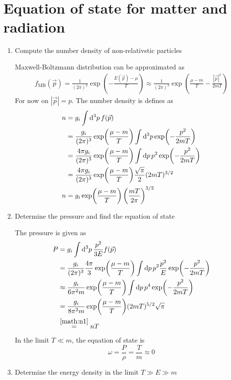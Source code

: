 \section{Equation of state for matter and radiation}

\begin{enumerate}[label=(\alph*)]
   \item Compute the number density of non-relativstic particles
   
      Maxwell-Boltzmann distribution can be approximated as
      \begin{align*}
         f_\text{MB}(\vec{p}) = \frac{1}{(2\pi)^3} \exp(-\frac{E(\vec{p}) - \mu}{T}) \approx \frac{1}{(2\pi)^3} \exp(\frac{\mu - m }{T} - \frac{|\vec{p}|^2}{2mT})
      \end{align*}
      For now on $|\vec{p}| = p$.
      The number density is defines as
      \begin{align}
         n &= g_i \int \dd[3]{p} f(\vec{p}) \notag \\
           &= \frac{g_i}{(2\pi)^3} \exp(\frac{\mu-m}{T}) \int \dd[3]{p} \exp(-\frac{p^2}{2mT}) \notag\\
           &= \frac{4 \pi g_i}{(2\pi)^3} \exp(\frac{\mu-m}{T}) \int \dd{p} p^2 \exp(-\frac{p^2}{2mT}) \notag\\
           &= \frac{4 \pi g_i}{(2\pi)^3} \exp(\frac{\mu-m}{T}) \frac{\sqrt{\pi}}{2} (2mT)^{3/2} \notag\\
         n &= g_i \exp(\frac{\mu-m}{T}) \left( \frac{mT}{2\pi} \right)^{3/2} \label{math:n1}
      \end{align}
   \item Determine the pressure and find the equation of state

         The pressure is given as
         \begin{align}
            P &= g_i \int \dd[3]{p} \frac{p^2}{3 E} f(\vec{p}) \notag \\
              &= \frac{g_i}{(2\pi)^3} \frac{4\pi}{3} \exp(\frac{\mu-m}{T}) \int \dd{p} p^2 \frac{p^2}{E} \exp(-\frac{p^2}{2mT}) \notag \\
              &\approx \frac{g_i}{6\pi^2 m }  \exp(\frac{\mu-m}{T}) \int \dd{p} p^4 \exp(-\frac{p^2}{2mT}) \notag \\
              &= \frac{g_i}{8\pi^2 m }  \exp(\frac{\mu-m}{T})  (2mT)^{5/2} \sqrt{\pi} \notag  \\
              &\stackrel{\ref{math:n1}}{=} nT \label{math:p1}
         \end{align}
         In the limit $T \ll m$, the equation of state is
         \begin{equation}
            \omega = \frac{P}{\rho} = \frac{T}{m} \approx 0
         \end{equation}
      \item Determine the energy density in the limit $T \gg E \gg m$


\end{enumerate}
